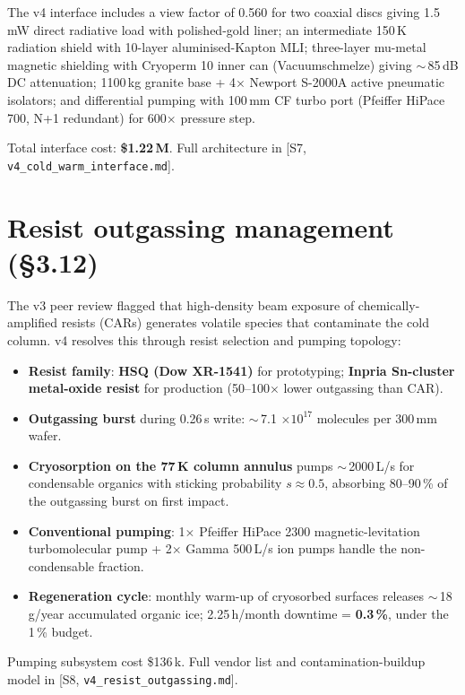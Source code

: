 \documentclass[11pt,letterpaper]{article}
\begin{document}
The v4 interface includes a view factor of 0.560 for two coaxial discs giving 1.5\,mW direct radiative load with polished-gold liner; an intermediate 150\,K radiation shield with 10-layer aluminised-Kapton MLI; three-layer mu-metal magnetic shielding with Cryoperm 10 inner can (Vacuumschmelze) giving $\sim$\,85\,dB DC attenuation; 1100\,kg granite base + 4$\times$ Newport S-2000A active pneumatic isolators; and differential pumping with 100\,mm CF turbo port (Pfeiffer HiPace 700, N+1 redundant) for 600$\times$ pressure step.

Total interface cost: \textbf{\$1.22\,M}. Full architecture in [S7, \texttt{v4\_cold\_warm\_interface.md}].

\section{Resist outgassing management (\S 3.12)}

The v3 peer review flagged that high-density beam exposure of chemically-amplified resists (CARs) generates volatile species that contaminate the cold column. v4 resolves this through resist selection and pumping topology:

\begin{itemize}[leftmargin=1.6em]
  \item \textbf{Resist family}: \textbf{HSQ (Dow XR-1541)} for prototyping; \textbf{Inpria Sn-cluster metal-oxide resist} for production (50--100$\times$ lower outgassing than CAR).
  \item \textbf{Outgassing burst} during 0.26\,s write: $\sim$\,7.1 $\times 10^{17}$ molecules per 300\,mm wafer.
  \item \textbf{Cryosorption on the 77\,K column annulus} pumps $\sim$\,2000\,L/s for condensable organics with sticking probability $s \approx 0.5$, absorbing 80--90\,\% of the outgassing burst on first impact.
  \item \textbf{Conventional pumping}: 1$\times$ Pfeiffer HiPace 2300 magnetic-levitation turbomolecular pump + 2$\times$ Gamma 500\,L/s ion pumps handle the non-condensable fraction.
  \item \textbf{Regeneration cycle}: monthly warm-up of cryosorbed surfaces releases $\sim$\,18\,g/year accumulated organic ice; 2.25\,h/month downtime = \textbf{0.3\,\%}, under the 1\,\% budget.
\end{itemize}

Pumping subsystem cost \$136\,k. Full vendor list and contamination-buildup model in [S8, \texttt{v4\_resist\_outgassing.md}].
\end{document}
